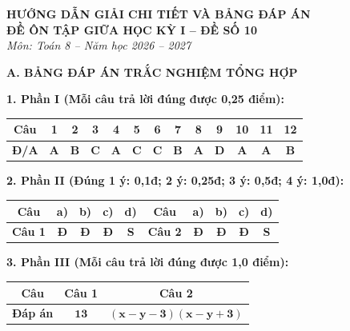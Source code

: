 \documentclass[12pt,a4paper]{article}
\begin{document}
\begin{center}
  \textbf{\Large HƯỚNG DẪN GIẢI CHI TIẾT VÀ BẢNG ĐÁP ÁN}\\
  \textbf{\large ĐỀ ÔN TẬP GIỮA HỌC KỲ I -- ĐỀ SỐ 10}\\
  \textit{Môn: Toán 8 -- Năm học 2026 -- 2027}
\end{center}
\vspace{2mm}

\noindent\textbf{\large A. BẢNG ĐÁP ÁN TRẮC NGHIỆM TỔNG HỢP}
\vspace{1mm}

\noindent\textbf{1. Phần I (Mỗi câu trả lời đúng được 0,25 điểm):}
\begin{center}
\begin{tabular}{|c|c|c|c|c|c|c|c|c|c|c|c|c|}
\hline
\textbf{Câu} & \textbf{1} & \textbf{2} & \textbf{3} & \textbf{4} & \textbf{5} & \textbf{6} & \textbf{7} & \textbf{8} & \textbf{9} & \textbf{10} & \textbf{11} & \textbf{12} \\
\hline
\textbf{Đ/A} & \textbf{A} & \textbf{B} & \textbf{C} & \textbf{A} & \textbf{C} & \textbf{C} & \textbf{B} & \textbf{A} & \textbf{D} & \textbf{A} & \textbf{A} & \textbf{B} \\
\hline
\end{tabular}
\end{center}
\vspace{0.5mm}

\noindent\textbf{2. Phần II (Đúng 1 ý: 0,1đ; 2 ý: 0,25đ; 3 ý: 0,5đ; 4 ý: 1,0đ):}
\begin{center}
\begin{tabular}{|c|c|c|c|c||c|c|c|c|c|}
\hline
\textbf{Câu} & \textbf{a)} & \textbf{b)} & \textbf{c)} & \textbf{d)} & \textbf{Câu} & \textbf{a)} & \textbf{b)} & \textbf{c)} & \textbf{d)} \\
\hline
\textbf{Câu 1} & \textbf{Đ} & \textbf{Đ} & \textbf{Đ} & \textbf{S} & \textbf{Câu 2} & \textbf{Đ} & \textbf{Đ} & \textbf{Đ} & \textbf{S} \\
\hline
\end{tabular}
\end{center}
\vspace{0.5mm}

\noindent\textbf{3. Phần III (Mỗi câu trả lời đúng được 1,0 điểm):}
\begin{center}
\begin{tabular}{|c|c|c|}
\hline
\textbf{Câu} & \textbf{Câu 1} & \textbf{Câu 2} \\
\hline
\textbf{Đáp án} & $\mathbf{13}$ & $\mathbf{(x - y - 3)(x - y + 3)}$ \\
\hline
\end{tabular}
\end{center}
\vspace{1.5mm}
\end{document}
